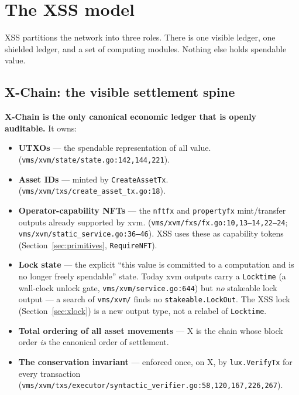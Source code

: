\section{The XSS model}
\label{sec:model}

XSS partitions the network into three roles. There is one visible
ledger, one shielded ledger, and a set of computing modules. Nothing
else holds spendable value.

\subsection{X-Chain: the visible settlement spine}

\textbf{X-Chain is the only canonical economic ledger that is openly
auditable.} It owns:

\begin{itemize}[leftmargin=2em,nosep]
\item \textbf{UTXOs} --- the spendable representation of all value.
  \IMPL{} (\texttt{vms/xvm/state/state.go:142,144,221}).
\item \textbf{Asset IDs} --- minted by \texttt{CreateAssetTx}. \IMPL{}
  (\texttt{vms/xvm/txs/create\_asset\_tx.go:18}).
\item \textbf{Operator-capability NFTs} --- the \texttt{nftfx} and
  \texttt{propertyfx} mint/transfer outputs already supported by xvm.
  \IMPL{} (\texttt{vms/xvm/fxs/fx.go:10,13--14,22--24};
  \texttt{vms/xvm/static\_service.go:36--46}). XSS uses these as
  capability tokens (Section~\ref{sec:primitives}, \texttt{RequireNFT}).
\item \textbf{Lock state} --- the explicit ``this value is committed to
  a computation and is no longer freely spendable'' state. \DESIGN{}
  Today xvm outputs carry a \texttt{Locktime} (a wall-clock unlock
  gate, \texttt{vms/xvm/service.go:644}) but \emph{no} stakeable lock
  output --- a search of \texttt{vms/xvm/} finds no
  \texttt{stakeable.LockOut}. The XSS lock
  (Section~\ref{sec:xlock}) is a new output type, not a relabel of
  \texttt{Locktime}.
\item \textbf{Total ordering of all asset movements} --- X is the chain
  whose block order \emph{is} the canonical order of settlement.
\item \textbf{The conservation invariant} --- enforced once, on X, by
  \texttt{lux.VerifyTx} for every transaction
  (\texttt{vms/xvm/txs/executor/syntactic\_verifier.go:58,120,167,226,267}).
\end{itemize}

